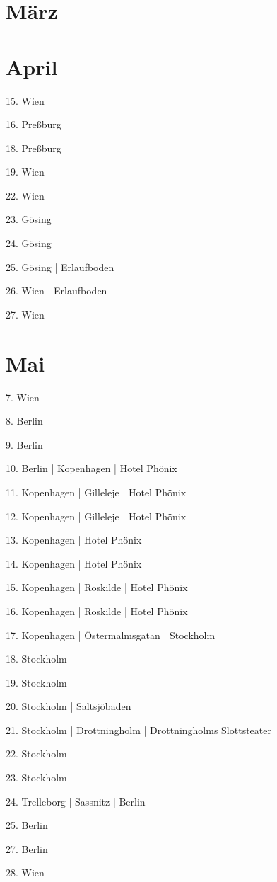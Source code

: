 \documentclass[twoside=false,titlepage=false,open=any, parskip=never, fontsize=10pt, headings=small, chapterprefix=false, appendixprefix=false, DIV=15]{scrbook}
\begin{document}
\begin{multicols}{3}
            \section*{März}
            \section*{April}
            15. Wien\par
            16. Preßburg\par
            18. Preßburg\par
            19. Wien\par
            22. Wien\par
            23. Gösing\par
            24. Gösing\par
            25. Gösing | Erlaufboden\par
            26. Wien | Erlaufboden\par
            27. Wien\par
            \section*{Mai}
            7. Wien\par
            8. Berlin\par
            9. Berlin\par
            10. Berlin | Kopenhagen | Hotel Phönix\par
            11. Kopenhagen | Gilleleje | Hotel Phönix\par
            12. Kopenhagen | Gilleleje | Hotel Phönix\par
            13. Kopenhagen | Hotel Phönix\par
            14. Kopenhagen | Hotel Phönix\par
            15. Kopenhagen | Roskilde | Hotel Phönix\par
            16. Kopenhagen | Roskilde | Hotel Phönix\par
            17. Kopenhagen | Östermalmsgatan | Stockholm\par
            18. Stockholm\par
            19. Stockholm\par
            20. Stockholm | Saltsjöbaden\par
            21. Stockholm | Drottningholm | Drottningholms Slottsteater\par
            22. Stockholm\par
            23. Stockholm\par
            24. Trelleborg | Sassnitz | Berlin\par
            25. Berlin\par
            27. Berlin\par
            28. Wien\par

\end{multicols}
\end{document}
